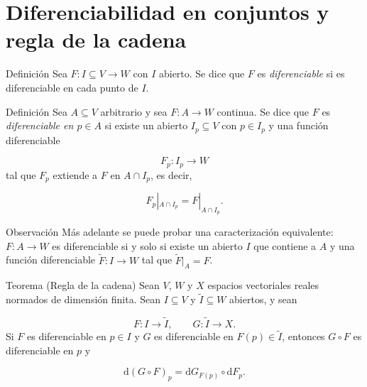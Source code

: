 \section{Diferenciabilidad en conjuntos y regla de la cadena}
\begin{bookdefinition}{Definición}
Sea $F \colon I \subseteq V \to W$ con $I$ abierto. Se dice que $F$ es \emph{diferenciable} si es diferenciable en cada punto de $I$.

\end{bookdefinition}
\begin{bookdefinition}{Definición}
Sea $A\subseteq V$ arbitrario y sea $F \colon A \to W$ continua. Se dice que $F$ es \emph{diferenciable en $p\in A$} si existe un abierto $I_p\subseteq V$ con $p\in I_p$ y una función diferenciable

\[
F_p \colon I_p \to W
\]
tal que $F_p$ extiende a $F$ en $A\cap I_p$, es decir,

\[
F_p|_{A\cap I_p}=F|_{A\cap I_p}.
\]
\end{bookdefinition}
\begin{bookremark}{Observación}
Más adelante se puede probar una caracterización equivalente: $F \colon A \to W$ es diferenciable si y solo si existe un abierto $I$ que contiene a $A$ y una función diferenciable $\widetilde{F}\colon I\to W$ tal que $\widetilde{F}|_A=F$.

\end{bookremark}
\begin{booktheorem}{Teorema (Regla de la cadena)}
Sean $V$, $W$ y $X$ espacios vectoriales reales normados de dimensión finita. Sean $I\subseteq V$ y $\widetilde{I}\subseteq W$ abiertos, y sean

\[
F \colon I \to \widetilde{I},
\qquad
G \colon \widetilde{I} \to X.
\]
Si $F$ es diferenciable en $p\in I$ y $G$ es diferenciable en $F(p)\in \widetilde{I}$, entonces $G\circ F$ es diferenciable en $p$ y

\[
\mathrm{d}(G\circ F)_p
=
\mathrm{d} G_{F(p)} \circ \mathrm{d} F_p.
\]
\end{booktheorem}
